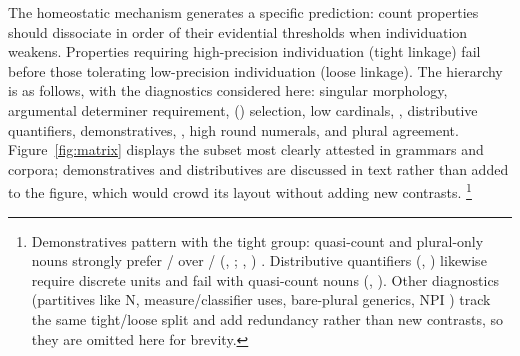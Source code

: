 \documentclass[12pt,a4paper]{article}
\begin{document}
The homeostatic mechanism generates a specific prediction: count properties should dissociate in order of their evidential thresholds when individuation weakens. Properties requiring high-precision individuation (tight linkage) fail before those tolerating low-precision individuation (loose linkage). The hierarchy is as follows, with the diagnostics considered here: singular morphology, argumental determiner requirement, () selection, low cardinals, , distributive quantifiers, demonstratives, , high round numerals, and plural agreement. Figure~\ref{fig:matrix} displays the subset most clearly attested in grammars and corpora; demonstratives and distributives are discussed in text rather than added to the figure, which would crowd its layout without adding new contrasts.%
\footnote{Demonstratives pattern with the tight group: quasi-count and plural-only nouns strongly prefer / over / (, ; , ) \citep[p.~356]{huddleston2002}. Distributive quantifiers (, ) likewise require discrete units and fail with quasi-count nouns (, ). Other diagnostics (partitives like  N, measure/classifier uses, bare-plural generics, NPI ) track the same tight/loose split and add redundancy rather than new contrasts, so they are omitted here for brevity.}
\end{document}
